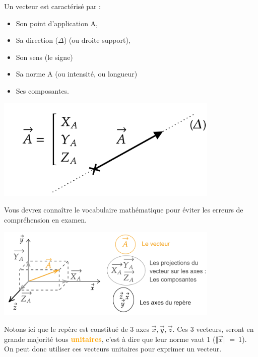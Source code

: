 \documentclass[12pt]{article}
\begin{document}
\begin{minipage}{.55\linewidth}
Un vecteur est caractérisé par :
\begin{itemize}
    \item Son point d’application A,
    \item Sa direction ($\Delta$) (ou droite support),
    \item Son sens (le signe)
    \item Sa norme A (ou intensité, ou longueur)
    \item Ses composantes.
\end{itemize}
\end{minipage}
\begin{minipage}{.44\linewidth}
\includegraphics[width=0.8\textwidth]{DD20.png}
\end{minipage}


\begin{tcolorbox}[colback=white!5!white,colframe=blue!75!black,title=Exemple]

Vous devrez connaître le vocabulaire mathématique pour éviter les erreurs de compréhension en examen. 

\includegraphics[width=0.8\textwidth]{DD21.png}

Notons ici que le repère est constitué de 3 axes $\Vec{x}, \Vec{y}, \Vec{z}$. Ces 3 vecteurs, seront en grande majorité tous \textcolor{orange}{\textbf{unitaires}}, c'est à dire que leur norme vaut 1 ($\Vert \vec{x}\Vert \ =\ 1$). On peut donc utiliser ces vecteurs unitaires pour exprimer un vecteur. 

\end{tcolorbox}
\end{document}
